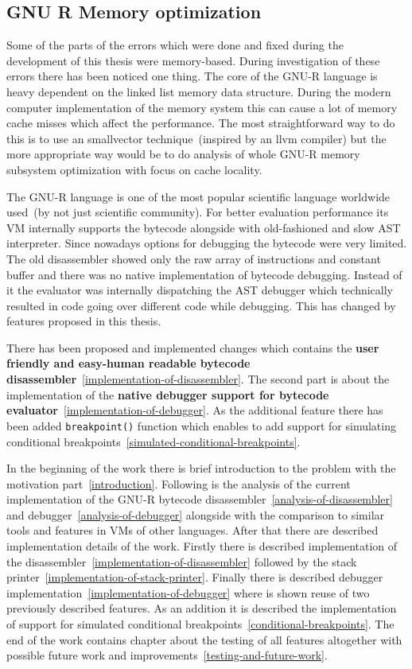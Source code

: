 \documentclass[thesis=M,english]{FITthesis}[2018/10/20]
\newcommand{\code}[1]{\texttt{#1}}
\begin{document}
{\subsection{GNU R Memory optimization}

Some of the parts of the errors which were done and fixed during the development of this thesis were memory-based. During investigation of these errors there has been noticed one thing. The core of the GNU-R language is heavy dependent on the linked list memory data structure. During the modern computer implementation of the memory system this can cause a lot of memory cache misses which affect the performance. The most straightforward way to do this is to use an smallvector technique~(inspired by an llvm compiler) but the more appropriate way would be to do analysis of whole GNU-R memory subsystem optimization with focus on cache locality.

\begin{conclusion}

The GNU-R language is one of the most popular scientific language worldwide used~(by not just scientific community). For better evaluation performance its VM internally supports the bytecode alongside with old-fashioned and slow AST interpreter. Since nowadays options for debugging the bytecode were very limited. The old disassembler showed only the raw array of instructions and constant buffer and there was no native implementation of bytecode debugging. Instead of it the evaluator was internally dispatching the AST debugger which technically resulted in code going over different code while debugging. This has changed by features proposed in this thesis.

There has been proposed and implemented changes which contains the \textbf{user friendly and easy-human readable bytecode disassembler}~\ref{implementation-of-disassembler}. The second part is about the implementation of the \textbf{native debugger support for bytecode evaluator}~\ref{implementation-of-debugger}. As the additional feature there has been added \code{breakpoint()} function which enables to add support for simulating conditional breakpoints~\ref{simulated-conditional-breakpoints}.

In the beginning of the work there is brief introduction to the problem with the motivation part~\ref{introduction}. Following is the analysis of the current implementation of the GNU-R bytecode disassembler~\ref{analysis-of-disassembler} and debugger~\ref{analysis-of-debugger} alongside with the comparison to similar tools and features in VMs of other languages. After that there are described implementation details of the work. Firstly there is described implementation of the disassembler~\ref{implementation-of-disassembler} followed by the stack printer~\ref{implementation-of-stack-printer}. Finally there is described debugger implementation~\ref{implementation-of-debugger} where is shown reuse of two previously described features. As an addition it is described the implementation of support for simulated conditional breakpoints~\ref{conditional-breakpoints}. The end of the work contains chapter about the testing of all features altogether with possible future work and improvements~\ref{testing-and-future-work}.


\end{conclusion}}
\end{document}
